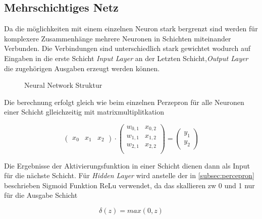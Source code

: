 \subsection{Mehrschichtiges Netz}\label{subsec:mlp}


Da die möglichkeiten mit einem einzelnen Neuron stark bergrenzt sind 
werden für komplexere Zusammenhänge mehrere Neuronen in Schichten 
miteinander Verbunden. Die Verbindungen sind unterschiedlich stark 
gewichtet wodurch auf Eingaben in die erste Schicht \textit{Input Layer} 
an der Letzten Schicht,\textit{Output Layer} die zugehörigen Ausgaben 
erzeugt werden können. 

\begin{figure}[htb]
    \centering
    
    \caption{Neural Network Struktur}
    \label{fig:nn}
\end{figure}



Die berechnung erfolgt gleich wie beim einzelnen Perzepron für alle Neuronen 
einer Schicht glleichzeitig mit matrixmultiplitkation

\begin{equation}
    \label{mat:feedforward}
    \begin{pmatrix}
        x_{0} & x_{1} & x_{2}
    \end{pmatrix}
    \cdot
    \begin{pmatrix}
        w_{0,1} & x_{0,2}\\
        w_{1,1} & x_{1,2}\\
        w_{2,1} & x_{2,2}\\
    \end{pmatrix}
    =
    \begin{pmatrix}
        y_{1}\\
        y_{2}
    \end{pmatrix}
\end{equation}


Die Ergebnisse der Aktivierungsfunktion in einer Schicht dienen 
dann als Input für die nächste Schicht. Für \textit{Hidden Layer}
wird anstelle der in \ref{subsec:percepron} beschrieben Sigmoid 
Funktion ReLu verwendet, da das skallieren zw 0 und 1 nur für die 
Ausgabe Schicht

\begin{equation}
    \label{eq:relu}
    \delta(z) = max(0,z)
\end{equation}

